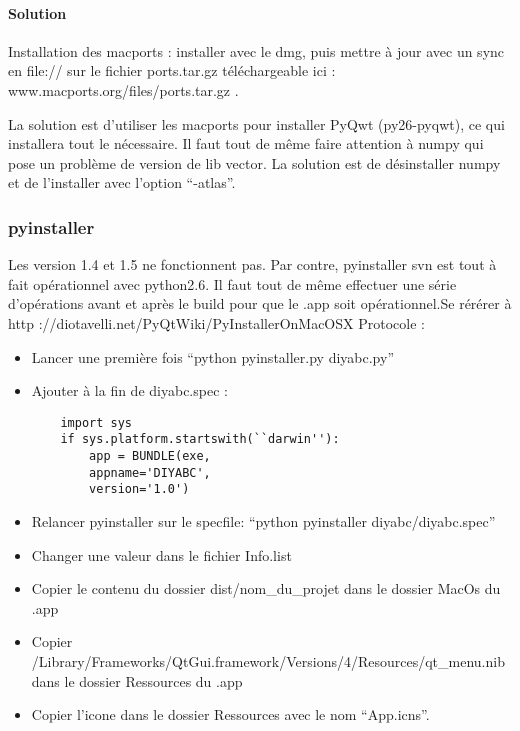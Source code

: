 \documentclass[12pt,a4paper]{article}
\begin{document}
        \paragraph{Solution}

        Installation des macports : installer avec le dmg, puis mettre à jour
        avec un sync en file:// sur le fichier ports.tar.gz téléchargeable ici : 
        www.macports.org/files/ports.tar.gz .

        La solution est d'utiliser les macports pour installer PyQwt
        (py26-pyqwt), ce qui installera tout le n\'ecessaire. Il faut tout de
        même faire attention à numpy qui pose un problème de version de lib
        vector. La solution est de d\'esinstaller numpy et de l'installer avec
        l'option ``-atlas''. 

        \subsubsection{pyinstaller}

        Les version 1.4 et 1.5 ne fonctionnent pas. Par contre, pyinstaller svn
        est tout à fait op\'erationnel avec python2.6. Il faut tout de même
        effectuer une s\'erie d'op\'erations avant et après le build pour que le
        .app soit op\'erationnel.Se r\'er\'erer à \newline http
        ://diotavelli.net/PyQtWiki/PyInstallerOnMacOSX \newline
        Protocole : \\

        \label{mac_pyinstaller}
        \begin{itemize}
            \item Lancer une première fois ``python pyinstaller.py diyabc.py''
            \item Ajouter à la fin de diyabc.spec :
        \begin{verbatim}
    import sys 
    if sys.platform.startswith(``darwin''): 
        app = BUNDLE(exe, 
        appname='DIYABC', 
        version='1.0')
        \end{verbatim}
            \item Relancer pyinstaller sur le specfile: ``python pyinstaller diyabc/diyabc.spec''
            \item Changer une valeur dans le fichier Info.list
            \item Copier le contenu du dossier dist/nom\_du\_projet dans le dossier MacOs du .app
            \item Copier /Library/Frameworks/QtGui.framework/Versions/4/Resources/qt\_menu.nib dans le dossier Ressources du .app
            \item Copier l'icone dans le dossier Ressources avec le nom ``App.icns''.\\
        \end{itemize}
\end{document}
